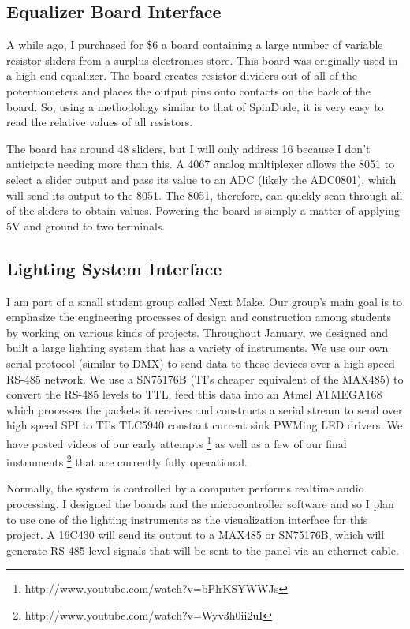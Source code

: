 \documentclass[letterpaper,10pt,notitlepage]{report}
\begin{document}
    \subsection{Equalizer Board Interface}

    A while ago, I purchased for \$6 a board containing a large number of 
    variable resistor sliders from a surplus electronics store.  This board 
    was originally used in a high end equalizer.  The board creates resistor 
    dividers out of all of the potentiometers and places the output pins onto 
    contacts on the back of the board.  So, using a methodology similar to 
    that of SpinDude, it is very easy to read the relative values of all resistors.

    The board has around 48 sliders, but I will only address 16 because I 
    don't anticipate needing more than this.  A 4067 analog multiplexer allows 
    the 8051 to select a slider output and pass its value to an ADC (likely 
    the ADC0801), which will send its output to the 8051.  The 8051, 
    therefore, can quickly scan through all of the sliders to obtain 
    values.  Powering the board is simply a matter of applying 5V and 
    ground to two terminals.

    \subsection{Lighting System Interface}

    I am part of a small student group called Next Make.  Our group's main 
    goal is to emphasize the engineering processes of design and construction 
    among students by working on various kinds of projects.  Throughout 
    January, we designed and built a large lighting system that has a variety of 
    instruments.  We use our own serial protocol (similar 
    to DMX) to send data to these devices over a high-speed RS-485 network.  
    We use a SN75176B (TI's cheaper equivalent of the MAX485) to convert the 
    RS-485 levels to TTL, feed this data into an Atmel ATMEGA168 which 
    processes the packets it receives and constructs a serial stream to send 
    over high speed SPI to TI's TLC5940 constant current sink PWMing LED 
    drivers.  We have posted videos of our early attempts%
        \footnote{http://www.youtube.com/watch?v=bPlrKSYWWJs}
    as well as a few of our final instruments%
        \footnote{http://www.youtube.com/watch?v=Wyv3h0ii2uI} that are 
    currently fully operational.

    Normally, the system is controlled by a computer performs realtime audio 
    processing.  I designed the boards and the microcontroller software and so I 
    plan to use one of the lighting instruments as the visualization interface 
    for this project.  A 16C430 will send its output to a MAX485 or SN75176B, 
    which will generate RS-485-level signals that will be sent to the panel 
    via an ethernet cable.  
\end{document}
